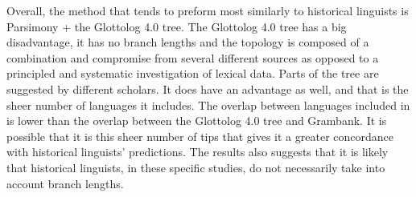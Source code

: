 \documentclass[a4paper,10pt]{article} %
\begin{document}
Overall, the method that tends to preform most similarly to historical linguists is Parsimony + the Glottolog 4.0 tree. The Glottolog 4.0 tree has a big disadvantage, it has no branch lengths and the topology is composed of a combination and compromise from several different sources as opposed to a principled and systematic investigation of lexical data. Parts of the tree are suggested by different scholars. It does have an advantage as well, and that is the sheer number of languages it includes. The overlap between languages included in \citet{grayetal_2009} is lower than the overlap between the Glottolog 4.0 tree and Grambank. It is possible that it is this sheer number of tips that gives it a greater concordance with historical linguists' predictions. The results also suggests that it is likely that historical linguists, in these specific studies, do not necessarily take into account branch lengths. 


\end{document}
